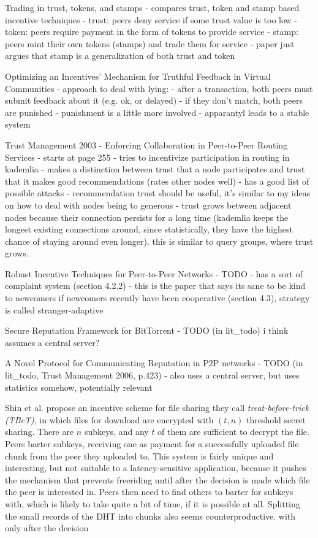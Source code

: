 \cite{moreton2003trading}
Trading in trust, tokens, and stamps
- compares trust, token and stamp based incentive techniques
- trust: peers deny service if some trust value is too low
- token: peers require payment in the form of tokens to provide service
- stamp: peers mint their own tokens (stamps) and trade them for service
- paper just argues that stamp is a generalization of both trust and token

\cite{papaioannou2005optimizing}
Optimizing an Incentives’ Mechanism for Truthful Feedback in Virtual Communities
- approach to deal with lying:
- after a transaction, both peers must submit feedback about it (e.g. ok, or
  delayed)
- if they don't match, both peers are punished
- punishment is a little more involved
- apparantyl leads to a stable system

\cite{moreton2003enforcing}
Trust Management 2003 - Enforcing Collaboration in Peer-to-Peer Routing Services
- starts at page 255
- tries to incentivize participation in routing in kademlia
- makes a distinction between trust that a node participates and trust that it
  makes good recommendations (rates other nodes well)
- has a good list of possible attacks
- recommendation trust should be useful, it's similar to my ideas on how to deal
  with nodes being to generous
- trust grows between adjacent nodes because their connection persists for a
  long time (kademlia keeps the longest existing connections around, since
  statistically, they have the highest chance of staying around even longer).
  this is similar to query groups, where trust grows.

\cite{feldman2004robust}
Robust Incentive Techniques for Peer-to-Peer Networks
- TODO
- has a sort of complaint system (section 4.2.2)
- this is the paper that says its sane to be kind to newcomers if newcomers
  recently have been cooperative (section 4.3), strategy is called
  stranger-adaptive

\cite{hassen2012secure}
Secure Reputation Framework for BitTorrent
- TODO (in lit\_todo) i think assumes a central server?

\cite{yonezawa2006novel}
A Novel Protocol for Communicating Reputation in P2P networks
- TODO (in lit\_todo, Trust Management 2006, p.423)
- also uses a central server, but uses statistics somehow, potentially relevant

Shin et al. propose an incentive scheme for file sharing they call
\emph{treat-before-trick (TBeT)}\cite{shin2009treat}, in which files for
download are encrypted with $(t, n)$ threshold secret sharing. There are $n$
subkeys, and any $t$ of them are sufficient to decrypt the file. Peers barter
subkeys, receiving one as payment for a successfully uploaded file chunk from
the peer they uploaded to. This system is fairly unique and interesting, but not
suitable to a latency-sensitive application, because it pushes the mechanism
that prevents freeriding until after the decision is made which file the peer is
interested in. Peers then need to find others to barter for subkeys with, which
is likely to take quite a bit of time, if it is possible at all. Splitting the
small records of the \ac{DHT} into chunks also seems counterproductive.
with only after the decision

